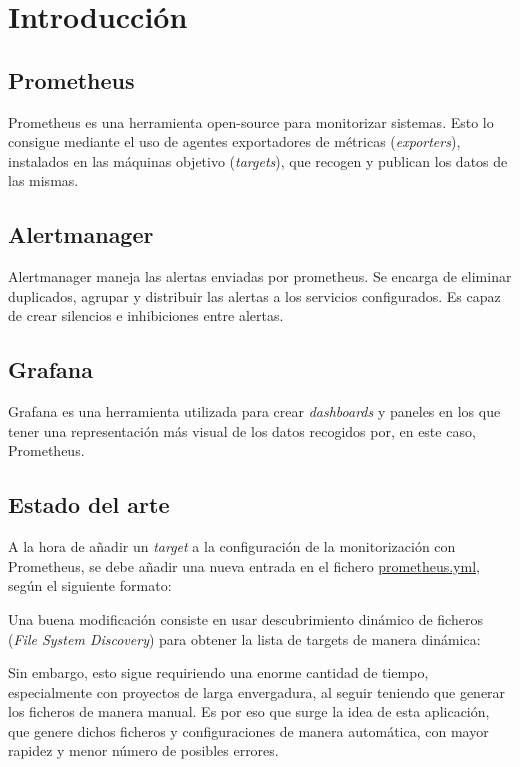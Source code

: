 \chapter{Introducción}
\label{ch:intro}
\section*{Prometheus}
Prometheus\cite{prometheus} es una herramienta open-source para monitorizar sistemas. Esto lo consigue mediante el uso de agentes exportadores de métricas (\textit{exporters}), instalados en las máquinas objetivo (\textit{targets}), que recogen y publican los datos de las mismas.

\section*{Alertmanager}
Alertmanager\cite{alertmanager} maneja las alertas enviadas por prometheus. Se encarga de eliminar duplicados, agrupar y distribuir las alertas a los servicios configurados. Es capaz de crear silencios e inhibiciones entre alertas.

\section*{Grafana}
Grafana\cite{grafana} es una herramienta utilizada para crear \textit{dashboards} y paneles en los que tener una representación más visual de los datos recogidos por, en este caso, Prometheus.

\section{Estado del arte}
A la hora de añadir un \textit{target} a la configuración de la monitorización con Prometheus, se debe añadir una nueva entrada en el fichero \url{prometheus.yml}, según el siguiente formato:



Una buena modificación consiste en usar descubrimiento dinámico de ficheros (\textit{File System Discovery}) para obtener la lista de targets de manera dinámica:



Sin embargo, esto sigue requiriendo una enorme cantidad de tiempo, especialmente con proyectos de larga envergadura, al seguir teniendo que generar los ficheros de manera manual. Es por eso que surge la idea de esta aplicación, que genere dichos ficheros y configuraciones de manera automática, con mayor rapidez y menor número de posibles errores.
